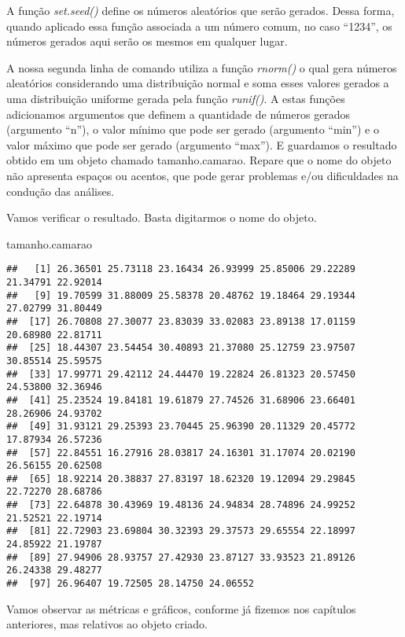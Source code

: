 \documentclass[]{book}
\newenvironment{Shaded}{\begin{snugshade}}{\end{snugshade}}
\newcommand{\NormalTok}[1]{#1}
\begin{document}
A função \emph{set.seed()} define os números aleatórios que serão gerados. Dessa forma, quando aplicado essa função associada a um número comum, no caso ``1234'', os números gerados aqui serão os mesmos em qualquer lugar.

A nossa segunda linha de comando utiliza a função \emph{rnorm()} o qual gera números aleatórios considerando uma distribuição normal e soma esses valores gerados a uma distribuição uniforme gerada pela função \emph{runif()}. A estas funções adicionamos argumentos que definem a quantidade de números gerados (argumento ``n''), o valor mínimo que pode ser gerado (argumento ``min'') e o valor máximo que pode ser gerado (argumento ``max''). E guardamos o resultado obtido em um objeto chamado tamanho.camarao. Repare que o nome do objeto não apresenta espaços ou acentos, que pode gerar problemas e/ou dificuldades na condução das análises.

Vamos verificar o resultado. Basta digitarmos o nome do objeto.

\begin{Shaded}
\begin{Highlighting}[]
\NormalTok{tamanho.camarao}
\end{Highlighting}
\end{Shaded}

\begin{verbatim}
##   [1] 26.36501 25.73118 23.16434 26.93999 25.85006 29.22289 21.34791 22.92014
##   [9] 19.70599 31.88009 25.58378 20.48762 19.18464 29.19344 27.02799 31.80449
##  [17] 26.70808 27.30077 23.83039 33.02083 23.89138 17.01159 20.68980 22.81711
##  [25] 18.44307 23.54454 30.40893 21.37080 25.12759 23.97507 30.85514 25.59575
##  [33] 17.99771 29.42112 24.44470 19.22824 26.81323 20.57450 24.53800 32.36946
##  [41] 25.23524 19.84181 19.61879 27.74526 31.68906 23.66401 28.26906 24.93702
##  [49] 31.93121 29.25393 23.70445 25.96390 20.11329 20.45772 17.87934 26.57236
##  [57] 22.84551 16.27916 28.03817 24.16301 31.17074 20.02190 26.56155 20.62508
##  [65] 18.92214 20.38837 27.83197 18.62320 19.12094 29.29845 22.72270 28.68786
##  [73] 22.64878 30.43969 19.48136 24.94834 28.74896 24.99252 21.52521 22.19714
##  [81] 22.72903 23.69804 30.32393 29.37573 29.65554 22.18997 24.85922 21.19787
##  [89] 27.94906 28.93757 27.42930 23.87127 33.93523 21.89126 26.24338 29.48277
##  [97] 26.96407 19.72505 28.14750 24.06552
\end{verbatim}

Vamos observar as métricas e gráficos, conforme já fizemos nos capítulos anteriores, mas relativos ao objeto criado.
\end{document}
